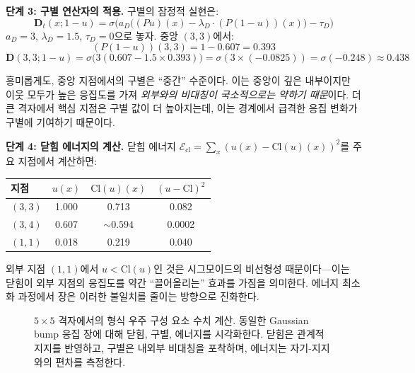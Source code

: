 \textbf{단계 3: 구별 연산자의 적용.} 구별의 잠정적 실현은:
\begin{equation}
    \mathbf{D}_t(x; 1-u) = \sigma\!\Big( a_D \big( (Pu)(x) - \lambda_D \cdot (P(1-u))(x) \big) - \tau_D \Big)
    \label{eq:d-provisional-ch3}
\end{equation}
$a_D = 3$, $\lambda_D = 1.5$, $\tau_D = 0$으로 놓자. 중앙 $(3,3)$에서:
\[
    (P(1-u))(3,3) = 1 - 0.607 = 0.393
\]
\[
    \mathbf{D}(3,3; 1-u) = \sigma\big(3(0.607 - 1.5 \times 0.393)\big) = \sigma(3 \times (-0.0825)) = \sigma(-0.248) \approx 0.438
\]

흥미롭게도, 중앙 지점에서의 구별은 ``중간'' 수준이다. 이는 중앙이 깊은 내부이지만 이웃 모두가 높은 응집도를 가져 \emph{외부와의 비대칭이 국소적으로는 약하기 때문}이다. 더 큰 격자에서 핵심 지점은 구별 값이 더 높아지는데, 이는 경계에서 급격한 응집 변화가 구별에 기여하기 때문이다.

\textbf{단계 4: 닫힘 에너지의 계산.} 닫힘 에너지 $\mathcal{E}_{\mathrm{cl}} = \sum_x (u(x) - \mathrm{Cl}(u)(x))^2$를 주요 지점에서 계산하면:
\begin{center}
\begin{tabular}{lccc}
\hline
\textbf{지점} & $u(x)$ & $\mathrm{Cl}(u)(x)$ & $(u - \mathrm{Cl})^2$ \\
\hline
$(3,3)$ & 1.000 & 0.713 & 0.082 \\
$(3,4)$ & 0.607 & $\sim 0.594$ & 0.0002 \\
$(1,1)$ & 0.018 & 0.219 & 0.040 \\
\hline
\end{tabular}
\end{center}

외부 지점 $(1,1)$에서 $u < \mathrm{Cl}(u)$인 것은 시그모이드의 비선형성 때문이다---이는 닫힘이 외부 지점의 응집도를 약간 ``끌어올리는'' 효과를 가짐을 의미한다. 에너지 최소화 과정에서 장은 이러한 불일치를 줄이는 방향으로 진화한다.

\begin{figure}[t]
\centering
{}
\caption{$5 \times 5$ 격자에서의 형식 우주 구성 요소 수치 계산. 동일한 Gaussian bump 응집 장에 대해 닫힘, 구별, 에너지를 시각화한다. 닫힘은 관계적 지지를 반영하고, 구별은 내외부 비대칭을 포착하며, 에너지는 자기-지지와의 편차를 측정한다.}
\label{fig:5x5-numerical}
\end{figure}

